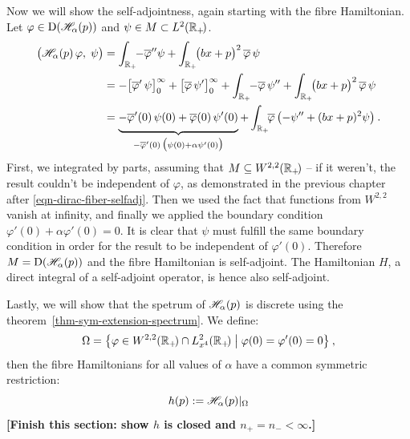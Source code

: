 Now we will show the self-adjointness, again starting with the fibre Hamiltonian. Let $\varphi \in \mathrm{D}(\mathscr{H}_\alpha(p))$ and $\psi \in M \subset L^2(\mathbb{R}_+\!)$.
\begin{align*}
    \big(\Hf_\alpha(p) \, \varphi, \; \psi \big)
    &= \int_{\R_+}\!\! -\overline\varphi'' \psi + \int_{\R_+}\!\! \big(bx + p\big)^2 \, \overline\varphi \, \psi \\
    &= - \big[ \overline\varphi' \, \psi \big]_0^\infty
    + \big[ \overline\varphi \, \psi' \big]_0^\infty
    + \int_{\R_+}\!\! -\overline\varphi \, \psi'' + \int_{\R_+}\!\! \big(bx + p\big)^2 \, \overline\varphi \, \psi \\
    &= \underbrace{
        - \overline\varphi'(0) \, \psi(0)
        + \overline\varphi(0) \, \psi'(0)
        \vphantom{\Big|}
    }_{
        -\overline\varphi'(0) \,
        \big( \psi(0) + \alpha \psi'(0) \big)
    }
    + \int_{\R_+}\!\! \overline\varphi \, \big( {-\psi''} + (bx+p)^2 \psi \big) \: .
\end{align*}
First, we integrated by parts, assuming that $M\subseteq W^{2,2}(\mathbb{R}_+\!)$ ­– if it weren't, the result couldn't be independent of $\varphi$, as demonstrated in the previous chapter after \eqref{eqn-dirac-fiber-selfadj}. Then we used the fact that functions from $W^{2,2}$ vanish at infinity, and finally we applied the boundary condition $\varphi'(0) + \alpha \varphi'(0) = 0$. It is clear that $\psi$ must fulfill the same boundary condition in order for the result to be independent of $\varphi'(0)$. Therefore $M=\mathrm{D}(\mathscr{H}_\alpha(p))$ and the fibre Hamiltonian is self-adjoint. The Hamiltonian $H$, a direct integral of a self-adjoint operator, is hence also self-adjoint.

Lastly, we will show that the spetrum of $\mathscr{H}_\alpha(p)$ is discrete using the theorem~\ref{thm-sym-extension-spectrum}. We define:
\begin{equation*}
    \Omega = \big\{ \varphi \in W^{2,2}(\mathbb{R}_+\!) \cap L^2_{x^4}(\mathbb{R}_+\!) \;\big|\; \varphi(0) = \varphi'(0) = 0 \big\}
    \: ,
\end{equation*}
then the fibre Hamiltonians for all values of $\alpha$ have a common symmetric restriction:
\begin{equation*}
    h(p) := \mathscr{H}_\alpha(p) |_\Omega
\end{equation*}
\textbf{[Finish this section: show $h$ is closed and $n_+=n_-<\infty$.]}

